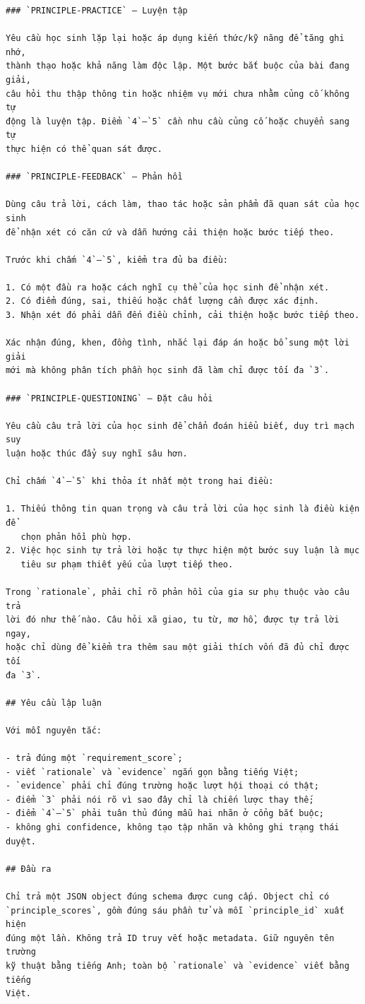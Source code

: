 \documentclass[conference]{IEEEtran}
\begin{document}
\begin{Verbatim}[breaklines=true,breakanywhere=true,fontsize=\scriptsize,formatcom=\rmfamily]
### `PRINCIPLE-PRACTICE` — Luyện tập

Yêu cầu học sinh lặp lại hoặc áp dụng kiến thức/kỹ năng để tăng ghi nhớ,
thành thạo hoặc khả năng làm độc lập. Một bước bắt buộc của bài đang giải,
câu hỏi thu thập thông tin hoặc nhiệm vụ mới chưa nhằm củng cố không tự
động là luyện tập. Điểm `4`–`5` cần nhu cầu củng cố hoặc chuyển sang tự
thực hiện có thể quan sát được.

### `PRINCIPLE-FEEDBACK` — Phản hồi

Dùng câu trả lời, cách làm, thao tác hoặc sản phẩm đã quan sát của học sinh
để nhận xét có căn cứ và dẫn hướng cải thiện hoặc bước tiếp theo.

Trước khi chấm `4`–`5`, kiểm tra đủ ba điều:

1. Có một đầu ra hoặc cách nghĩ cụ thể của học sinh để nhận xét.
2. Có điểm đúng, sai, thiếu hoặc chất lượng cần được xác định.
3. Nhận xét đó phải dẫn đến điều chỉnh, cải thiện hoặc bước tiếp theo.

Xác nhận đúng, khen, đồng tình, nhắc lại đáp án hoặc bổ sung một lời giải
mới mà không phân tích phần học sinh đã làm chỉ được tối đa `3`.

### `PRINCIPLE-QUESTIONING` — Đặt câu hỏi

Yêu cầu câu trả lời của học sinh để chẩn đoán hiểu biết, duy trì mạch suy
luận hoặc thúc đẩy suy nghĩ sâu hơn.

Chỉ chấm `4`–`5` khi thỏa ít nhất một trong hai điều:

1. Thiếu thông tin quan trọng và câu trả lời của học sinh là điều kiện để
   chọn phản hồi phù hợp.
2. Việc học sinh tự trả lời hoặc tự thực hiện một bước suy luận là mục
   tiêu sư phạm thiết yếu của lượt tiếp theo.

Trong `rationale`, phải chỉ rõ phản hồi của gia sư phụ thuộc vào câu trả
lời đó như thế nào. Câu hỏi xã giao, tu từ, mơ hồ, được tự trả lời ngay,
hoặc chỉ dùng để kiểm tra thêm sau một giải thích vốn đã đủ chỉ được tối
đa `3`.

## Yêu cầu lập luận

Với mỗi nguyên tắc:

- trả đúng một `requirement_score`;
- viết `rationale` và `evidence` ngắn gọn bằng tiếng Việt;
- `evidence` phải chỉ đúng trường hoặc lượt hội thoại có thật;
- điểm `3` phải nói rõ vì sao đây chỉ là chiến lược thay thế;
- điểm `4`–`5` phải tuân thủ đúng mẫu hai nhãn ở cổng bắt buộc;
- không ghi confidence, không tạo tập nhãn và không ghi trạng thái duyệt.

## Đầu ra

Chỉ trả một JSON object đúng schema được cung cấp. Object chỉ có
`principle_scores`, gồm đúng sáu phần tử và mỗi `principle_id` xuất hiện
đúng một lần. Không trả ID truy vết hoặc metadata. Giữ nguyên tên trường
kỹ thuật bằng tiếng Anh; toàn bộ `rationale` và `evidence` viết bằng tiếng
Việt.
\end{Verbatim}
\end{document}
